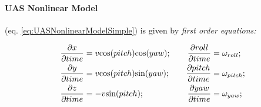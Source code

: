 \paragraph{UAS Nonlinear Model} (eq. \ref{eq:UASNonlinearModelSimple}) is given by \emph{first order equations:}

\begin{equation}\label{eq:UASNonlinearModelSimple}
    \begin{aligned}
        \frac{\partial x}{\partial time} &= v\cos(pitch)\cos(yaw);\\
        \frac{\partial y}{\partial time} &= v\cos(pitch)\sin(yaw);\\
        \frac{\partial z}{\partial time} &= -v\sin(pitch);\\
    \end{aligned}\\\quad\quad
    \begin{aligned}
        \frac{\partial roll}{\partial time} &= \omega_{roll};\\
        \frac{\partial pitch}{\partial time} &= \omega_{pitch};\\
        \frac{\partial yaw}{\partial time} &= \omega_{yaw};\\
    \end{aligned}
\end{equation}

